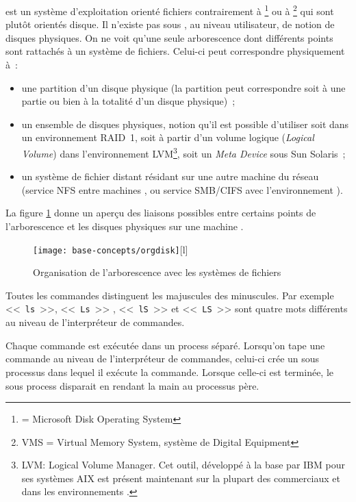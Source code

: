 {\Unix} est un syst{\`e}me d'exploitation orient{\'e} fichiers contrairement
{\`a} {\DOS}\footnote{{\DOS}= Microsoft Disk Operating System} ou {\`a}
{\OpenVMS}\footnote{VMS = Virtual Memory System, syst{\`e}me de Digital Equipment}
qui sont plut{\^o}t orient{\'e}s disque. Il n'existe pas sous {\Unix}, au
niveau utilisateur, de notion de disques physiques. On ne voit qu'une
seule arborescence dont diff{\'e}rents points sont rattach{\'e}s {\`a} un syst{\`e}me de
fichiers. Celui-ci peut correspondre physiquement {\`a}~:
\begin{itemize}
	\item une partition d'un disque physique (la partition peut correspondre
	      soit {\`a} une partie ou bien {\`a} la totalit{\'e} d'un disque physique)~;
	\item un ensemble de disques physiques, notion qu'il est possible d'utiliser soit dans
un environnement RAID~1, soit {\`a} partir d'un volume logique ({\sl Logical Volume})
dans l'environnement LVM\footnote{LVM: Logical Volume Manager. Cet outil, d{\'e}velopp{\'e}
{\`a} la base par IBM pour ses syst{\`e}mes AIX est pr{\'e}sent maintenant sur la plupart
des {\Unix} commerciaux et dans les environnements {\Linux}.}, soit un
{\sl Meta Device} sous Sun Solaris~;
	\item un syst{\`e}me de fichier distant r{\'e}sidant sur une autre machine du r{\'e}seau
	      (service NFS entre machines {\Unix}, ou service SMB/CIFS avec l'environnement {\Windows}).
\end{itemize}

La figure \ref{fig-bcpts-orgdisk} donne un aper\c{c}u des liaisons possibles
entre certains points de l'arborescence et les disques physiques sur une
machine {\Unix}.

\begin{figure}[hbtp]
\centering
	\texttt{[image: base-concepts/orgdisk]}[l]
	\caption{\label{fig-bcpts-orgdisk}Organisation de l'arborescence {\Unix} avec les syst{\`e}mes de fichiers}
\end{figure}

Toutes les commandes {\Unix} distinguent les majuscules des
minuscules. Par exemple <<~{\tt ls}~>>, <<~{\tt Ls}~>> , <<~{\tt lS}~>>
et <<~{\tt LS}~>> sont quatre mots diff{\'e}rents au niveau de
l'interpr{\'e}teur de commandes.

Chaque commande {\Unix} est ex{\'e}cut{\'e}e dans un process
s{\'e}par{\'e}. Lorsqu'on tape une commande au niveau de
l'interpr{\'e}teur de commandes, celui-ci cr{\'e}e un sous processus dans
lequel il ex{\'e}cute la commande. Lorsque celle-ci est termin{\'e}e, le
sous process disparait en rendant la main au processus p{\`e}re.

